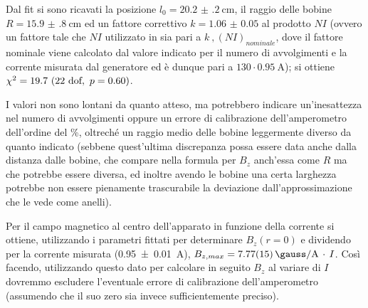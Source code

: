 Dal fit si sono ricavati la posizione $l_0 = \SI{20.2(2)}{\cm} $, il raggio delle bobine $R = \SI{15.9(8)}{\cm}$ ed un fattore correttivo $k = \num{1.06(5)}$ al prodotto $N I$ (ovvero un fattore tale che $N I$ utilizzato in  sia pari a $k\ , (N I)_{nominale}$, dove il fattore nominale viene calcolato dal valore indicato per il numero di avvolgimenti e la corrente misurata dal generatore ed è dunque pari a $130 \cdot  \SI{0.95}{\A}$); si ottiene $\chi^2 = 19.7 \ (22 \text{ dof} , \  p = 0.60)$.

I valori non sono lontani da quanto atteso, ma potrebbero indicare un'inesattezza nel numero di avvolgimenti oppure un errore di calibrazione dell'amperometro dell'ordine del \%, oltreché un raggio medio delle bobine leggermente diverso da quanto indicato (sebbene quest'ultima discrepanza possa essere data anche dalla distanza dalle bobine, che compare nella formula per $B_z$ anch'essa come $R$ ma che potrebbe essere diversa, ed inoltre avendo le bobine una certa larghezza potrebbe non essere pienamente trascurabile la deviazione dall'approssimazione che le vede come anelli).

Per il campo magnetico al centro dell'apparato in funzione della corrente si ottiene, utilizzando i parametri fittati per determinare $B_z(r=0)$ e dividendo per la corrente misurata (\SI{0.95(1)}{\A}), $B_{z,max} = \SI{7.77(15)}{\gauss\per\A} \, \cdot \, I$.
Così facendo, utilizzando questo dato per calcolare in seguito $B_z$ al variare di $I$ dovremmo escludere l'eventuale errore di calibrazione dell'amperometro (assumendo che il suo zero sia invece sufficientemente preciso).
